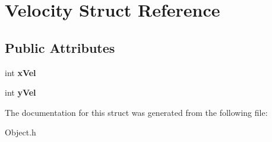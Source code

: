 \hypertarget{structVelocity}{\section{Velocity Struct Reference}
\label{structVelocity}
}
\subsection*{Public Attributes}
\begin{DoxyCompactItemize}
\item 
\hypertarget{structVelocity_a87d82f672105324e6c5a93a763f6d686}{int {\bfseries x\-Vel}}\label{structVelocity_a87d82f672105324e6c5a93a763f6d686}

\item 
\hypertarget{structVelocity_a400c85cbd1669348aca25afe0ae95883}{int {\bfseries y\-Vel}}\label{structVelocity_a400c85cbd1669348aca25afe0ae95883}

\end{DoxyCompactItemize}


The documentation for this struct was generated from the following file\-:\begin{DoxyCompactItemize}
\item 
Object.\-h\end{DoxyCompactItemize}
